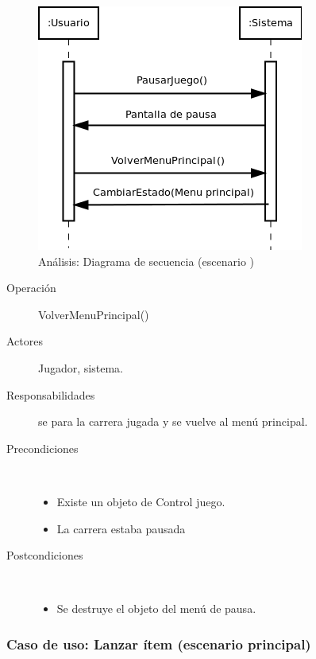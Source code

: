 \begin{figure}[H] 
  \label{secuencia_pausar3}
  \begin{center}
    \includegraphics[scale=0.7]{imagenes/analisis/secuencia_pausar3.png}
  \end{center}
  \caption{Análisis: Diagrama de secuencia (escenario )}
\end{figure}

\begin{description}
    \item [Operación] VolverMenuPrincipal()
    \item [Actores] Jugador, sistema.
    \item [Responsabilidades] se para la carrera jugada y se vuelve al menú principal.
    \item [Precondiciones] $\quad$
        \begin{itemize}
            \item Existe un objeto de Control juego.
            \item La carrera estaba pausada
        \end{itemize}
    \item [Postcondiciones] $\quad$
        \begin{itemize}
            \item Se destruye el objeto del menú de pausa.
        \end{itemize}
\end{description}

\subsubsection{Caso de uso: Lanzar ítem (escenario principal)}


